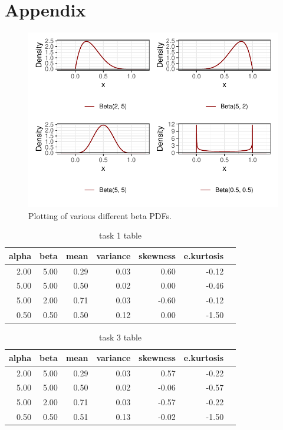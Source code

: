 \documentclass{article}\usepackage[]{graphicx}\usepackage[]{xcolor}
\makeatletter
\def\maxwidth{ %
  \ifdim\Gin@nat@width>\linewidth
    \linewidth
  \else
    \Gin@nat@width
  \fi
}
\newenvironment{knitrout}{}{} %
\makeatother
\begin{document}
\section{Appendix}
 \begin{figure}[H]
 \begin{center}
\begin{knitrout}
\color{fgcolor}
\includegraphics[width=\maxwidth]{figure/unnamed-chunk-2-1} 
\end{knitrout}
 \caption{Plotting of various different beta PDFs.}
 \label{plot1} %
 \end{center}
 \end{figure}
 \begin{table}[ht]
\centering
\begin{tabular}{rrrrrrr}
  \hline
  alpha & beta & mean & variance & skewness & e.kurtosis \\ 
  \hline
  2.00 & 5.00 & 0.29 & 0.03 & 0.60 & -0.12 \\ 
  5.00 & 5.00 & 0.50 & 0.02 & 0.00 & -0.46 \\ 
  5.00 & 2.00 & 0.71 & 0.03 & -0.60 & -0.12 \\ 
  0.50 & 0.50 & 0.50 & 0.12 & 0.00 & -1.50 \\ 
   \hline
\end{tabular}
\caption{task 1 table}
\label{table1}
\end{table}

\begin{table}[ht]
\centering
\begin{tabular}{rrrrrrr}
  \hline
  alpha & beta & mean & variance & skewness & e.kurtosis \\ 
  \hline
  2.00 & 5.00 & 0.29 & 0.03 & 0.57 & -0.22 \\ 
  5.00 & 5.00 & 0.50 & 0.02 & -0.06 & -0.57 \\ 
  5.00 & 2.00 & 0.71 & 0.03 & -0.57 & -0.22 \\ 
  0.50 & 0.50 & 0.51 & 0.13 & -0.02 & -1.50 \\ 
   \hline
\end{tabular}
\caption{task 3 table}
\label{table2}
\end{table}
\end{document}
